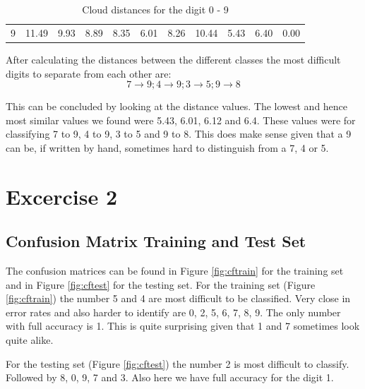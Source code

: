 \documentclass{article}
\begin{document}
\begin{table}[]
\begin{tabular}{lllllllllll}
		\multicolumn{1}{l|}{9} & \multicolumn{1}{l|}{11.49}                        & \multicolumn{1}{l|}{9.93}                         & \multicolumn{1}{l|}{8.89}                         & \multicolumn{1}{l|}{8.35}                         & \multicolumn{1}{l|}{6.01}                         & \multicolumn{1}{l|}{8.26}                         & \multicolumn{1}{l|}{10.44}                        & \multicolumn{1}{l|}{5.43}                         & \multicolumn{1}{l|}{6.40}                         & \multicolumn{1}{l|}{\cellcolor[HTML]{C0C0C0}0.00} \\ \cline{2-11} 	
	\end{tabular}
	\caption{Cloud distances for the digit 0 - 9}
\end{table}

After calculating the distances between the different classes the most difficult digits to separate from each other are: \[ 7 \rightarrow 9; 4 \rightarrow 9; 3 \rightarrow 5; 9 \rightarrow 8\]

This can be concluded by looking at the distance values. The lowest and hence most similar values we found were 5.43, 6.01, 6.12 and 6.4.
These values were for classifying 7 to 9, 4 to 9, 3 to 5 and 9 to 8.
This does make sense given that a 9 can be, if written by hand, sometimes hard to distinguish from a 7, 4 or 5.


\section{Excercise 2}
\subsection{Confusion Matrix Training and Test Set}
The confusion matrices can be found in Figure \ref{fig:cftrain} for the training set and in Figure \ref{fig:cftest} for the testing set.
For the training set (Figure \ref{fig:cftrain}) the number 5 and 4 are most difficult to be classified. Very close in error rates and also harder to identify are 0, 2, 5, 6, 7, 8, 9. The only number with full accuracy is 1. This is quite surprising given that 1 and 7 sometimes look quite alike.

For the testing set (Figure \ref{fig:cftest}) the number 2 is most difficult to classify. Followed by 8, 0, 9, 7 and 3. Also here we have full accuracy for the digit 1.
\end{document}
